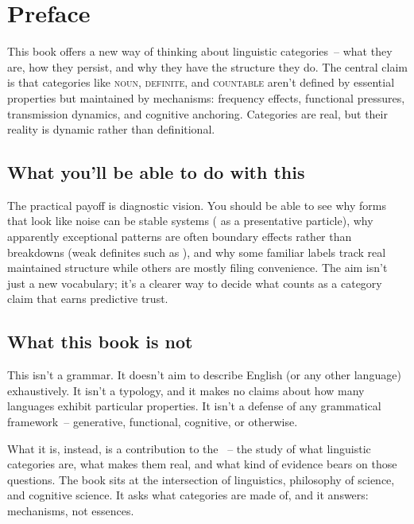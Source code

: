 \chapter*{Preface}


This book offers a new way of thinking about linguistic categories~-- what they are, how they persist, and why they have the structure they do. The central claim is that categories like \textsc{noun}, \textsc{definite}, and \textsc{countable} aren't defined by essential properties but maintained by mechanisms: frequency effects, functional pressures, transmission dynamics, and cognitive anchoring. Categories are real, but their reality is dynamic rather than definitional.

\section*{What you'll be able to do with this}

The practical payoff is diagnostic vision. You should be able to see why forms that look like noise can be stable systems ( as a presentative particle), why apparently exceptional patterns are often boundary effects rather than breakdowns (weak definites such as ), and why some familiar labels track real maintained structure while others are mostly filing convenience. The aim isn't just a new vocabulary; it's a clearer way to decide what counts as a category claim that earns predictive trust.

\section*{What this book is not}

This isn't a grammar. It doesn't aim to describe English (or any other language) exhaustively. It isn't a typology, and it makes no claims about how many languages exhibit particular properties. It isn't a defense of any grammatical framework~-- generative, functional, cognitive, or otherwise.

What it is, instead, is a contribution to the ~-- the study of what linguistic categories are, what makes them real, and what kind of evidence bears on those questions. The book sits at the intersection of linguistics, philosophy of science, and cognitive science. It asks what categories are made of, and it answers: mechanisms, not essences.

